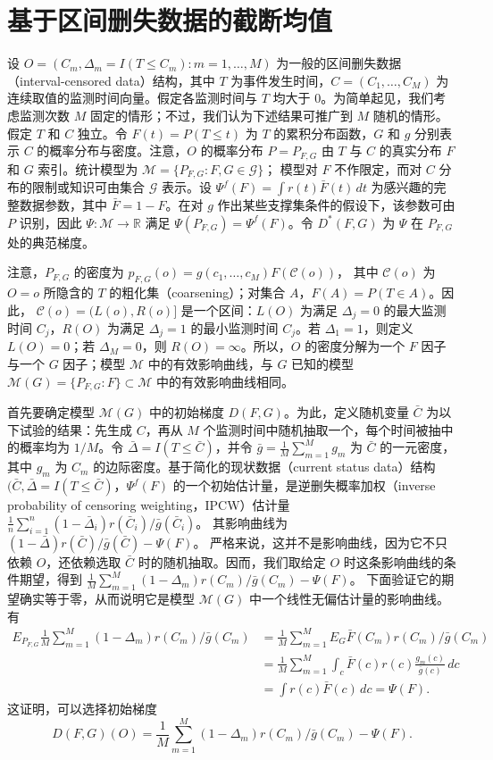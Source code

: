 \section{基于区间删失数据的截断均值}

设 $O=(C_m,\Delta_m=I(T\leq C_m):m=1,\ldots,M)$ 为一般的区间删失数据（interval-censored data）结构，其中 $T$ 为事件发生时间，$C=(C_1,\ldots,C_M)$ 为连续取值的监测时间向量。假定各监测时间与 $T$ 均大于 0。为简单起见，我们考虑监测次数 $M$ 固定的情形；不过，我们认为下述结果可推广到 $M$ 随机的情形。假定 $T$ 和 $C$ 独立。令 $F(t)=P(T\leq t)$ 为 $T$ 的累积分布函数，$G$ 和 $g$ 分别表示 $C$ 的概率分布与密度。注意，$O$ 的概率分布 $P=P_{F,G}$ 由 $T$ 与 $C$ 的真实分布 $F$ 和 $G$ 索引。统计模型为
$\mathcal M=\{P_{F,G}:F,G\in\mathcal G\}$；
模型对 $F$ 不作限定，而对 $C$ 分布的限制或知识可由集合 $\mathcal G$ 表示。设
$\Psi^f(F)=\int r(t)\bar F(t)\,dt$
为感兴趣的完整数据参数，其中 $\bar F=1-F$。在对 $g$ 作出某些支撑集条件的假设下，该参数可由 $P$ 识别，因此 $\Psi:\mathcal M\to\mathbb R$ 满足 $\Psi(P_{F,G})=\Psi^f(F)$。令 $D^*(F,G)$ 为 $\Psi$ 在 $P_{F,G}$ 处的典范梯度。

注意，$P_{F,G}$ 的密度为
$p_{F,G}(o)=g(c_1,\ldots,c_M)F(\mathcal C(o))$，
其中 $\mathcal C(o)$ 为 $O=o$ 所隐含的 $T$ 的粗化集（coarsening）；对集合 $A$，$F(A)=P(T\in A)$。因此，
$\mathcal C(o)=(L(o),R(o)]$
是一个区间：$L(O)$ 为满足 $\Delta_j=0$ 的最大监测时间 $C_j$，$R(O)$ 为满足 $\Delta_j=1$ 的最小监测时间 $C_j$。若 $\Delta_1=1$，则定义 $L(O)=0$；若 $\Delta_M=0$，则 $R(O)=\infty$。所以，$O$ 的密度分解为一个 $F$ 因子与一个 $G$ 因子；模型 $\mathcal M$ 中的有效影响曲线，与 $G$ 已知的模型 $\mathcal M(G)=\{P_{F,G}:F\}\subset\mathcal M$ 中的有效影响曲线相同。

首先要确定模型 $\mathcal M(G)$ 中的初始梯度 $D(F,G)$。为此，定义随机变量 $\bar C$ 为以下试验的结果：先生成 $C$，再从 $M$ 个监测时间中随机抽取一个，每个时间被抽中的概率均为 $1/M$。令 $\bar\Delta=I(T\leq\bar C)$，并令
$\bar g=\frac1M\sum_{m=1}^M g_m$
为 $\bar C$ 的一元密度，其中 $g_m$ 为 $C_m$ 的边际密度。基于简化的现状数据（current status data）结构 $(\bar C,\bar\Delta=I(T\leq\bar C)$，$\Psi^f(F)$ 的一个初始估计量，是逆删失概率加权（inverse probability of censoring weighting，IPCW）估计量
$\frac1n\sum_{i=1}^n(1-\bar\Delta_i)r(\bar C_i)/\bar g(\bar C_i)$。
其影响曲线为
$(1-\bar\Delta)r(\bar C)/\bar g(\bar C)-\Psi(F)$。
严格来说，这并不是影响曲线，因为它不只依赖 $O$，还依赖选取 $\bar C$ 时的随机抽取。因而，我们取给定 $O$ 时这条影响曲线的条件期望，得到
$\frac1M\sum_{m=1}^M(1-\Delta_m)r(C_m)/\bar g(C_m)-\Psi(F)$。
下面验证它的期望确实等于零，从而说明它是模型 $\mathcal M(G)$ 中一个线性无偏估计量的影响曲线。有
\[
 \begin{aligned}
 E_{P_{F,G}}\frac1M\sum_{m=1}^M
 (1-\Delta_m)r(C_m)/\bar g(C_m)
 &=\frac1M\sum_{m=1}^M E_G\bar F(C_m)r(C_m)/\bar g(C_m)\\
 &=\frac1M\sum_{m=1}^M\int_c
 \bar F(c)r(c)\frac{g_m(c)}{\bar g(c)}\,dc\\
 &=\int r(c)\bar F(c)\,dc=\Psi(F).
 \end{aligned}
\]
这证明，可以选择初始梯度
\[
 D(F,G)(O)=\frac1M\sum_{m=1}^M
 (1-\Delta_m)r(C_m)/\bar g(C_m)-\Psi(F).
\]

